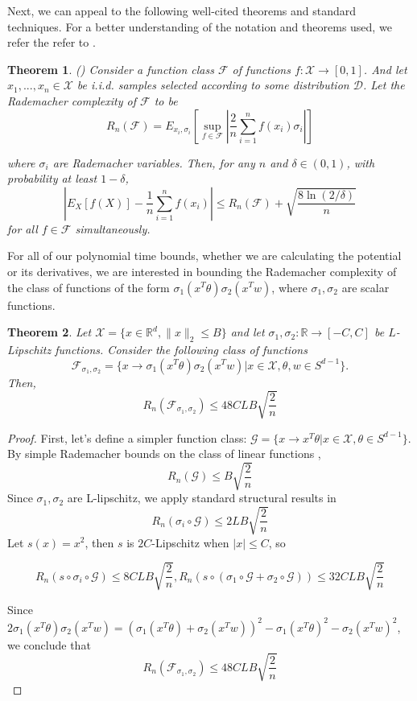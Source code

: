 \documentclass{article}
\newtheorem{theorem}{Theorem}[section]
\newcommand{\R}{{\mathbb{R}}}
\begin{document}
Next, we can appeal to the following well-cited theorems and standard techniques. For a better understanding of the notation and theorems used, we refer the refer to \cite{bartlett2002rademacher}.
%
\begin{theorem} (\cite{bartlett2002rademacher}) 
Consider a function class $\mathcal{F}$ of functions $f : \mathcal{X} \to [0,1]$. And let $ x_1,...,x_n \in \mathcal{X}$ be i.i.d. samples selected according to some distribution $\mathcal{D}$. Let the Rademacher complexity of $\mathcal{F}$ to be 
\[R_n (\mathcal{F}) = E_{x_i,\sigma_i}\left[\sup_{f \in \mathcal{F}} \left|\frac{2}{n}\sum_{i=1}^nf(x_i)\sigma_i\right|\right]\]

where $\sigma_i$ are Rademacher variables. Then, for any $n$ and $\delta \in (0,1)$, with probability at least $1-\delta$, 
\[|E_{X}[f(X)]  - \frac{1}{n}\sum_{i=1}^n f(x_i)| \leq R_n(\mathcal{F}) + \sqrt{\frac{8\ln(2/\delta)}{n}} \]
for all $f \in\mathcal{F}$ simultaneously.
\end{theorem}

For all of our polynomial time bounds, whether we are calculating the potential or its derivatives, we are interested in bounding the Rademacher complexity of the class of functions of the form $\sigma_1(x^T\theta) \sigma_2(x^Tw)$, where $\sigma_1,\sigma_2$ are scalar functions.

\begin{theorem}
Let $\mathcal{X} = \{x \in \R^d, \|x\|_2\leq B\}$ and let $\sigma_1,\sigma_2 : \R \to [-C,C]$ be $L$-Lipschitz functions. Consider the following class of functions
%
\[\mathcal{F}_{\sigma_1,\sigma_2} = \{x\to\sigma_1(x^T\theta) \sigma_2(x^Tw) | x\in\mathcal{X}, \theta, w \in S^{d-1}\}.\]
Then, \[R_n(\mathcal{F}_{\sigma_1,\sigma_2}) \leq 48CLB\sqrt{\frac{2}{n}}\]
\end{theorem}
\begin{proof}
First, let's define a simpler function class: $\mathcal{G} = \{x\to x^T\theta  | x\in\mathcal{X}, \theta \in S^{d-1}\}$. By simple Rademacher bounds on the class of linear functions \cite{kakade2009complexity}, 
 \[R_n(\mathcal{G}) \leq B\sqrt{\frac{2}{n}}\]
%
Since $\sigma_1,\sigma_2$ are L-lipschitz, we apply standard structural results in \cite{bartlett2002rademacher}
%
\[R_n(\sigma_i\circ \mathcal{G}) \leq 2LB\sqrt{\frac{2}{n}}\]
%
Let $s(x) = x^2$, then $s$ is $2C$-Lipschitz when $|x|\leq C$, so 

\[R_n(s\circ \sigma_i\circ\mathcal{G}) \leq 8CLB\sqrt{\frac{2}{n}}, R_n(s\circ(\sigma_1\circ \mathcal{G} +\sigma_2\circ \mathcal{G})) \leq 32 CLB\sqrt{\frac{2}{n}}\]
 
Since $2\sigma_1(x^T\theta)\sigma_2(x^Tw) = (\sigma_1(x^T\theta)+\sigma_2(x^Tw))^2 - \sigma_1(x^T\theta)^2 - \sigma_2(x^Tw)^2$, we conclude that 
\[R_n (\mathcal{F}_{\sigma_1,\sigma_2}) \leq 48CLB\sqrt{\frac{2}{n}}\]
\end{proof}
\end{document}
